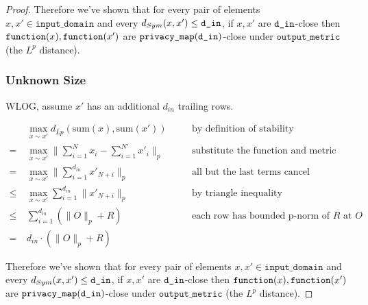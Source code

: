 \documentclass{article}
\begin{document}
\begin{proof}
    Therefore we've shown that for every pair of elements $x, x' \in \texttt{input\_domain}$ and every $d_{Sym}(x, x') \le \texttt{d\_in}$, 
    if $x, x'$ are $\texttt{d\_in}$-close then $\texttt{function}(x),\texttt{function}(x')$ are $\texttt{privacy\_map}(\texttt{d\_in})$-close under $\texttt{output\_metric}$ (the $L^p$ distance).

\subsubsection{Unknown Size}

    WLOG, assume $x'$ has an additional $d_{in}$ trailing rows.

    \begin{align}
        & \ \max_{x \sim x'} d_{Lp}(\mathrm{sum}(x), \mathrm{sum}(x')) && \quad \text{by definition of stability}\\
        =&\ \max_{x \sim x'} \lVert\sum_{i = 1}^N x_i - \sum_{i = 1}^{N'} x'_i \rVert_p && \quad \text{substitute the function and metric} \\
        =&\ \max_{x \sim x'} \lVert\sum_{i = 1}^{d_{in}} x'_{N + i}\rVert_p && \quad\text{all but the last terms cancel} \\
        \le&\ \max_{x \sim x'} \sum_{i = 1}^{d_{in}} \lVert x'_{N + i} \rVert_p && \quad \text{by triangle inequality} \\
        \le&\ \sum_{i = 1}^{d_{in}} (\lVert O \rVert_p + R) && \quad\text{each row has bounded p-norm of } R \text{ at } O \\
        =&\ d_{in} \cdot (\lVert O \rVert_p + R)
    \end{align}
    
    Therefore we've shown that for every pair of elements $x, x' \in \texttt{input\_domain}$ and every $d_{Sym}(x, x') \le \texttt{d\_in}$, 
    if $x, x'$ are $\texttt{d\_in}$-close then $\texttt{function}(x),\texttt{function}(x')$ are $\texttt{privacy\_map}(\texttt{d\_in})$-close under $\texttt{output\_metric}$ (the $L^p$ distance).

\end{proof}
\end{document}
